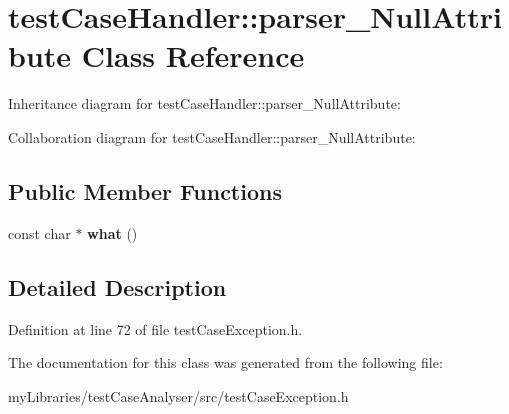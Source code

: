 \hypertarget{classtestCaseHandler_1_1parser__NullAttribute}{}\section{test\+Case\+Handler\+::parser\+\_\+\+Null\+Attribute Class Reference}
\label{classtestCaseHandler_1_1parser__NullAttribute}


Inheritance diagram for test\+Case\+Handler\+::parser\+\_\+\+Null\+Attribute\+:


Collaboration diagram for test\+Case\+Handler\+::parser\+\_\+\+Null\+Attribute\+:
\subsection*{Public Member Functions}
\begin{DoxyCompactItemize}
\item 
\mbox{\label{classtestCaseHandler_1_1parser__NullAttribute_a708a6bddb5748e13ffd8490a99b6e6d6}} 
const char $\ast$ {\bfseries what} ()
\end{DoxyCompactItemize}


\subsection{Detailed Description}


Definition at line 72 of file test\+Case\+Exception.\+h.



The documentation for this class was generated from the following file\+:\begin{DoxyCompactItemize}
\item 
my\+Libraries/test\+Case\+Analyser/src/test\+Case\+Exception.\+h\end{DoxyCompactItemize}
